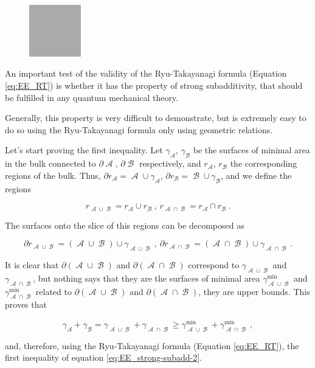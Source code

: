 \documentclass[lettersize,journal]{IEEEtran}
\providecommand{\eq}[2]{
    \begin{equation}
        #2
    \label{eq:#1}
    \end{equation}
}
\DeclareMathOperator{\calA}{\mathcal{A}}
\DeclareMathOperator{\calB}{\mathcal{B}}
\begin{document}
\begin{figure}
    \centering
    \includegraphics[width=0.2\textwidth]{../Imatges/empty.png}
\caption{}
\label{fig:}
\end{figure}

An important test of the validity of the Ryu-Takayanagi formula (Equation \ref{eq:EE_RT}) is whether it has the property of strong subadditivity, that should be fulfilled in any quantum mechanical theory.

Generally, this property is very difficult to demonstrate, but is extremely easy to do so using the Ryu-Takayanagi formula only using geometric relations.

Let's start proving the first inequality. Let $\gamma_{\calA}$, $\gamma_{\calB}$ be the surfaces of minimal area in the bulk connected to $\partial \calA$, $\partial \calB$ respectively, and $r_{\calA}$, $r_{\calB}$ the corresponding regions of the bulk. Thus, $\partial r_{\calA} = \calA \cup \gamma_{\calA}$, $\partial r_{\calB} = \calB \cup \gamma_{\calB}$, and we define the regions
\eq{SS_r-1}{
    r_{\calA \cup \calB} = r_{\calA} \cup r_{\calB} \ , \ r_{\calA \cap \calB} = r_{\calA} \cap r_{\calB} \ .
}
The surfaces onto the slice of this regions can be decomposed as
\eq{SS_dr-1}{
    \partial r_{\calA \cup \calB} = (\calA \cup \calB) \cup \gamma_{\calA \cup \calB} \ , \ \partial r_{\calA \cap \calB } = (\calA \cap \calB) \cup \gamma_{\calA \cap \calB} \ .
    }
It is clear that $\partial (\calA \cup \calB)$ and $\partial (\calA \cap \calB)$ correspond to $\gamma_{\calA \cup \calB}$ and $\gamma_{\calA \cap \calB}$, but nothing says that they are the surfaces of minimal area $\gamma^{\text{min}}_{\calA \cup \calB}$ and $\gamma^{\text{min}}_{\calA \cap \calB}$ related to $\partial (\calA \cup \calB)$ and $\partial (\calA \cap \calB)$, they are upper bounds. This proves that
\eq{SS_gamma-1}{
    \gamma_{\calA} + \gamma_{\calB} = \gamma_{\calA \cup \calB} + \gamma_{\calA \cap \calB} \ge \gamma^{\text{min}}_{\calA \cup \calB} + \gamma^{\text{min}}_{\calA \cap \calB} \ ,
}
and, therefore, using the Ryu-Takayanagi formula (Equation \ref{eq:EE_RT}), the first inequality of equation \ref{eq:EE_strong-subadd-2}.
\end{document}
